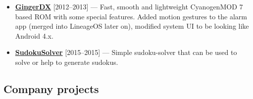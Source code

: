 \documentclass[a4paper]{article}
\begin{document}
\begin{itemize}
		\item {\footnotesize \faAndroid \enskip \href{https://forum.xda-developers.com/showthread.php?t=1188486}{\textbf{GingerDX}} [2012--2013] --- Fast, smooth and lightweight CyanogenMOD 7 based ROM with some special features. Added motion gestures to the alarm app (merged into LineageOS later on), modified system UI to be looking like Android 4.x.}
		
		\item {\footnotesize \href{https://github.com/AChep/SudokuSolver}{\textbf{SudokuSolver}} [2015--2015] --- Simple sudoku-solver that can be used to solve or help to generate sudokus.}
	\end{itemize}
	
	\subsection*{Company projects}
\end{document}
